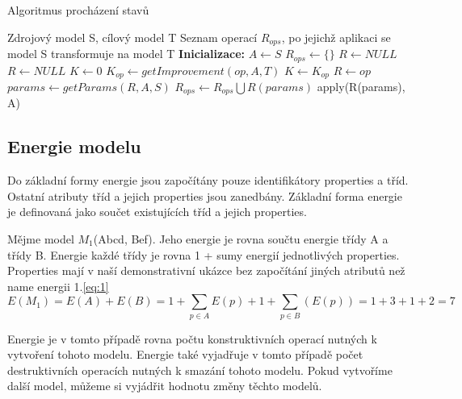 \documentclass[11pt,twoside,a4paper]{book}
\begin{document}
\begin{algorithm}
\caption{Algoritmus procházení stavů}\label{algo:state}

\begin{algorithmic}[1]
\Require Zdrojový model S, cílový model T
\Ensure Seznam operací $R_{ops}$, po jejichž aplikaci se model S transformuje na
     model T
\Statex
\State \textbf{Inicializace:}
\State $A \gets S$ 
\State $R_{ops} \gets \{\}$
\State $R\gets NULL$ 
\Statex
  \Repeat \label{algo:state:repeat}
   \State $R\gets NULL$
   \State $K\gets 0$ \label{algo:state:improvement}
   	   
   	  \label{algo:state:forOps}
   	  \State $K_{op} \gets getImprovement(op, A, T)$ 
      	\Comment
      	  \State $K\gets K_{op}$
      	  \State $R \gets op$
      	\EndIf
      \EndFor \label{algo:state:forOpsEnd} 
       \label{algo:state:addOp}
         \State $params \gets getParams(R, A, S)$ \label{algo:state:getParams}
         \State $R_{ops}\gets R_{ops} \bigcup R(params)$
         \State apply(R(params), A)      
      \EndIf
   \label{algo:state:terminal_condition}
\end{algorithmic}

\end{algorithm}

\subsection{Energie modelu}
Do základní formy energie jsou započítány pouze identifikátory properties a
tříd. Ostatní atributy tříd a jejich properties jsou zanedbány. Základní forma
energie je definovaná jako součet existujících tříd a jejich properties.

Mějme model $M_1$(Abcd, Bef). Jeho energie je rovna součtu energie třídy A a
třídy B. Energie každé třídy je rovna 1 + sumy energií jednotlivých properties.
Properties mají v naší demonstrativní ukázce bez započítání jiných atributů než
name energii 1.\ref{eq:1}
 $$E(M_1) = E(A) + E(B) = 1 + \sum_{p \in A}E(p) + 1 + \sum_{p
\in B}(E(p)) = 1 + 3 + 1 + 2 = 7$$\label{eq:1}

Energie je v tomto případě rovna počtu konstruktivních operací nutných k
vytvoření tohoto modelu. Energie také vyjadřuje v tomto případě počet
destruktivních operacích nutných k smazání tohoto modelu. Pokud vytvoříme
další model, můžeme si vyjádřit hodnotu změny těchto modelů. 
\end{document}
